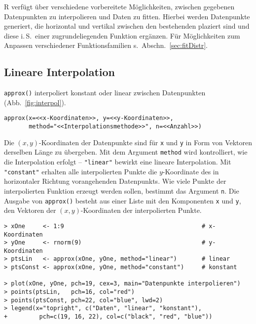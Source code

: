 R verfügt über verschiedene vorbereitete Möglichkeiten, zwischen gegebenen Datenpunkten zu interpolieren und Daten zu fitten. Hierbei werden Datenpunkte generiert, die horizontal und vertikal zwischen den bestehenden plaziert sind und diese i.\,S.\ einer zugrundeliegenden Funktion ergänzen. Für Möglichkeiten zum Anpassen verschiedener Funktionsfamilien s.\ Abschn.\ \ref{sec:fitDistr}.

\subsection{Lineare Interpolation}
\label{sec:linearInter}

\lstinline!approx()! interpoliert konstant oder linear zwischen Datenpunkten (Abb.\ \ref{fig:interpol}).
\begin{lstlisting}
approx(x=<<x-Koordinaten>>, y=<<y-Koordinaten>>,
       method="<<Interpolationsmethode>>", n=<<Anzahl>>)
\end{lstlisting}

Die $(x, y)$-Koordinaten der Datenpunkte sind für \lstinline!x! und \lstinline!y! in Form von Vektoren derselben Länge zu übergeben. Mit dem Argument \lstinline!method! wird kontrolliert, wie die Interpolation erfolgt -- \lstinline!"linear"! bewirkt eine lineare Interpolation. Mit \lstinline!"constant"! erhalten alle interpolierten Punkte die $y$-Koordinate des in horizontaler Richtung vorangehenden Datenpunkts. Wie viele Punkte der interpolierten Funktion erzeugt werden sollen, bestimmt das Argument \lstinline!n!. Die Ausgabe von \lstinline!approx()! besteht aus einer Liste mit den Komponenten \lstinline!x! und \lstinline!y!, den Vektoren der $(x, y)$-Koordinaten der interpolierten Punkte.
\begin{lstlisting}
> xOne     <- 1:9                                       # x-Koordinaten
> yOne     <- rnorm(9)                                  # y-Koordinaten
> ptsLin   <- approx(xOne, yOne, method="linear")       # linear
> ptsConst <- approx(xOne, yOne, method="constant")     # konstant

> plot(xOne, yOne, pch=19, cex=3, main="Datenpunkte interpolieren")
> points(ptsLin,   pch=16, col="red")
> points(ptsConst, pch=22, col="blue", lwd=2)
> legend(x="topright", c("Daten", "linear", "konstant"),
+         pch=c(19, 16, 22), col=c("black", "red", "blue"))
\end{lstlisting}

